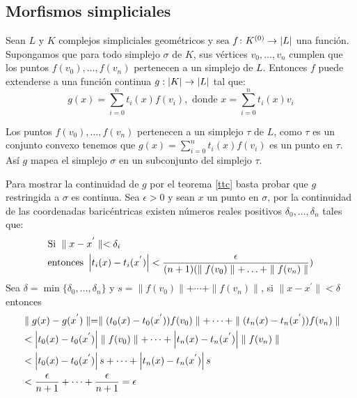 \subsection{Morfismos simpliciales}
\begin{Teo} \label{tms}
Sean $L$ y $K$ complejos simpliciales geométricos y sea $f\colon K^{(0)} \rightarrow \left| L \right|$ una función. Supongamos que  para todo simplejo $\sigma$ de $K$, sus vértices $v_0,\ldots,v_n$ cumplen que los puntos $f(v_0),\ldots,f(v_n)$ pertenecen a un simplejo de $L$.
Entonces $f$ puede extenderse a una función continua $g:\left| K \right|  \rightarrow \left| L \right|$ tal que:
\begin{equation*}
g(x)= \sum_{i=0}^{n}t_i(x)f(v_i), \textrm{ donde }  x= \sum_{i=0}^{n}t_i(x)v_i
\end{equation*}
\end{Teo}
\begin{Dem}

Los puntos $f(v_0),\ldots,f(v_n)$ pertenecen a un simplejo $\tau$ de $L$, como $\tau$ es un conjunto convexo tenemos que $g(x)= \sum_{i=0}^{n}t_i(x)f(v_i)$ es un punto en $\tau$. Así $g$ mapea el simplejo $\sigma$ en un subconjunto del simplejo $\tau$.

Para mostrar la continuidad de $g$ por el teorema \ref{ttc} basta probar que $g$ restringida a $\sigma$ es continua. Sea $\epsilon > 0$ y sean $x$ un punto en $\sigma$, por la continuidad de las coordenadas baricéntricas existen números reales positivos $\delta_{0},\ldots,\delta_{n}$ tales que:
\begin{align*}
&\text{Si }\parallel x-x^{'} \parallel < \delta_{i}\\
&\text{entonces } \left| t_i(x)-t_i(x^{'}) \right|< \frac{\epsilon}{(n+1)(\parallel f(v_0)\parallel + \ldots+\parallel f(v_n)\parallel})
\end{align*}
Sea $\delta = \min\{\delta_0,\ldots,\delta_n\}$ y $s = \parallel f(v_0)\parallel + \cdots+\parallel f(v_n)\parallel$, si $\parallel x-x^{'}\parallel< \delta$ entonces
\begin{align*}
&\parallel g(x)-g(x^{'})\parallel = \parallel(t_0(x)-t_0(x^{'}))f(v_0)\parallel+\cdots+\parallel(t_n(x)-t_n(x^{'}))f(v_n)\parallel\\
&< \left| t_0(x)-t_0(x^{'}) \right|\parallel f(v_0)\parallel+\cdots +  \left| t_n(x)-t_n(x^{'}) \right|\parallel f(v_n)\parallel \\
&< \left| t_0(x)-t_0(x^{'}) \right|s+\cdots +  \left| t_n(x)-t_n(x^{'}) \right|s\\
&< \frac{\epsilon}{n+1}+\cdots + \frac{\epsilon}{n+1} = \epsilon
\end{align*}
\end{Dem}
